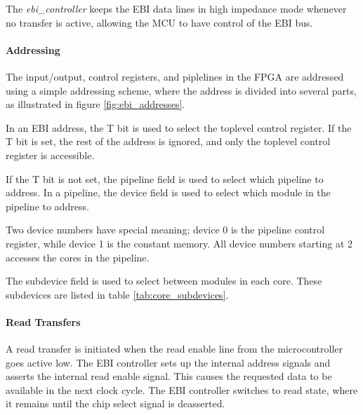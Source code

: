 The \textit{ebi\_controller} keeps the EBI data lines in high impedance mode
whenever no transfer is active, allowing the MCU to have control of the EBI bus.



\FloatBarrier
\paragraph{Addressing}

The input/output, control registers, and piplelines in the FPGA are addressed
using a simple addressing scheme, where the address is divided into several
parts, as illustrated in figure \ref{fig:ebi_addresses}.



In an EBI address, the T bit is used to select the toplevel control register.
If the T bit is set, the rest of the address is ignored, and only the toplevel
control register is accessible.

If the T bit is not set, the pipeline field is used to select which pipeline to
address. In a pipeline, the device field is used to select which module in the
pipeline to address.

Two device numbers have special meaning; device 0 is the pipeline control
register, while device 1 is the constant memory. All device numbers starting at
2 accesses the cores in the pipeline.

The subdevice field is used to select between modules in each core. These
subdevices are listed in table \ref{tab:core_subdevices}.



\FloatBarrier
\paragraph{Read Transfers}

A read transfer is initiated when the read enable line from the microcontroller
goes active low. The EBI controller sets up the internal address signals and
asserts the internal read enable signal. This causes the requested data to be
available in the next clock cycle. The EBI controller switches to read state,
where it remains until the chip select signal is deasserted.

